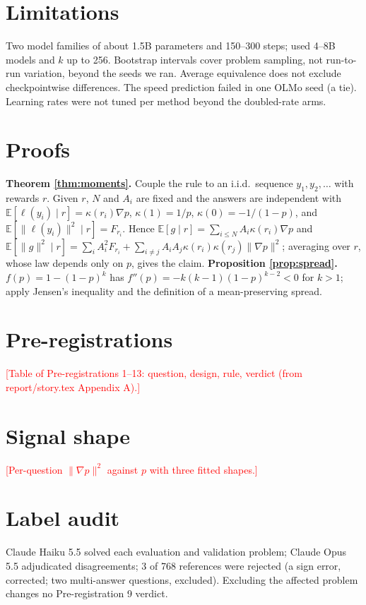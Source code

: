 \documentclass{article}
\theoremstyle{plain}
\theoremstyle{remark}
\newcommand{\E}{\mathbb E}
\newcommand{\pending}[1]{\textcolor{red}{[#1]}}
\begin{document}
\section{Limitations}
Two model families of about 1.5B parameters and 150--300 steps; \citet{zhu2025nsr} used 4--8B models and $k$ up to 256. Bootstrap intervals cover problem sampling, not run-to-run variation, beyond the seeds we ran. Average equivalence does not exclude checkpointwise differences. The speed prediction failed in one OLMo seed (a tie). Learning rates were not tuned per method beyond the doubled-rate arms.




\newpage
\appendix
\onecolumn
\section{Proofs}\label{app:proofs}
\textbf{Theorem \ref{thm:moments}.} Couple the rule to an i.i.d.\ sequence $y_1,y_2,\dots$ with rewards $r$. Given $r$, $N$ and $A_i$ are fixed and the answers are independent with $\E[\ell(y_i)\mid r]=\kappa(r_i)\nabla p$, $\kappa(1)=1/p$, $\kappa(0)=-1/(1-p)$, and $\E[\|\ell(y_i)\|^2\mid r]=F_{r_i}$. Hence $\E[g\mid r]=\sum_{i\le N}A_i\kappa(r_i)\nabla p$ and $\E[\|g\|^2\mid r]=\sum_iA_i^2F_{r_i}+\sum_{i\neq j}A_iA_j\kappa(r_i)\kappa(r_j)\|\nabla p\|^2$; averaging over $r$, whose law depends only on $p$, gives the claim. \textbf{Proposition \ref{prop:spread}.} $f(p)=1-(1-p)^k$ has $f''(p)=-k(k-1)(1-p)^{k-2}<0$ for $k>1$; apply Jensen's inequality and the definition of a mean-preserving spread.

\section{Pre-registrations}\label{app:prereg}
\pending{Table of Pre-registrations 1--13: question, design, rule, verdict (from report/story.tex Appendix A).}

\section{Signal shape}\label{app:shape}
\pending{Per-question $\|\nabla p\|^2$ against $p$ with three fitted shapes.}

\section{Label audit}\label{app:labels}
Claude Haiku 5.5 solved each evaluation and validation problem; Claude Opus 5.5 adjudicated disagreements; 3 of 768 references were rejected (a sign error, corrected; two multi-answer questions, excluded). Excluding the affected problem changes no Pre-registration 9 verdict.
\end{document}
